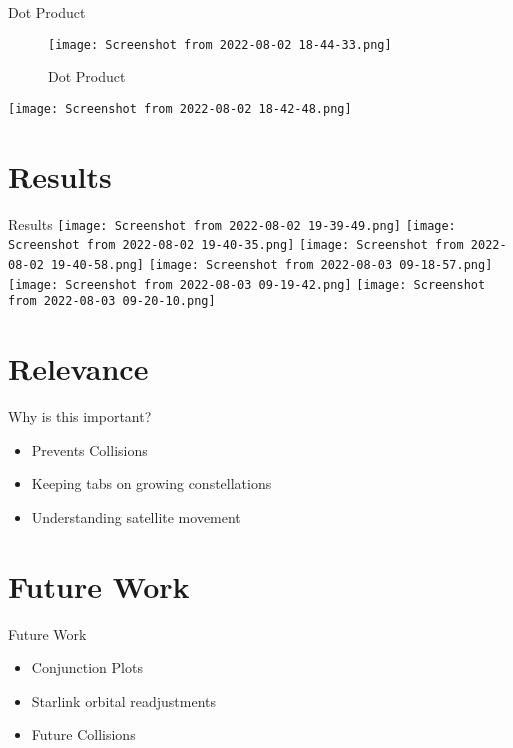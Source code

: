 \documentclass{beamer}
\begin{document}
\begin{frame}{Dot Product}
\begin{figure}
\texttt{[image: Screenshot from 2022-08-02 18-44-33.png]}
	\caption{Dot Product}
\end{figure}
\end{frame}

\begin{frame}
\texttt{[image: Screenshot from 2022-08-02 18-42-48.png]}
\end{frame}

\section{Results}
\begin{frame}{Results}
\texttt{[image: Screenshot from 2022-08-02 19-39-49.png]}
\texttt{[image: Screenshot from 2022-08-02 19-40-35.png]}
\texttt{[image: Screenshot from 2022-08-02 19-40-58.png]}
\texttt{[image: Screenshot from 2022-08-03 09-18-57.png]}
\texttt{[image: Screenshot from 2022-08-03 09-19-42.png]}
\texttt{[image: Screenshot from 2022-08-03 09-20-10.png]}
\end{frame}

\section{Relevance}
\begin{frame}{Why is this important?}
\begin{itemize}
\item Prevents Collisions
\item Keeping tabs on growing constellations
\item Understanding satellite movement
\end{itemize}
\end{frame}

\section{Future Work}
\begin{frame}{Future Work}
\begin{itemize}
\item Conjunction Plots
\item Starlink orbital readjustments
\item Future Collisions
\end{itemize}
\end{frame}
\end{document}
